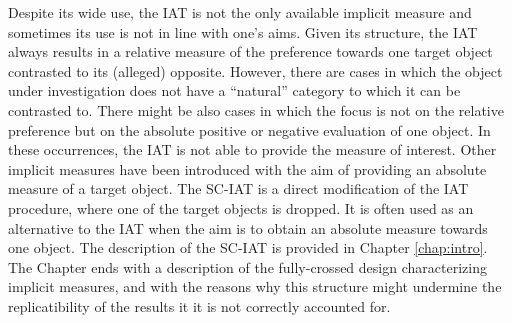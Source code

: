 \documentclass[12pt]{book}
\begin{document}
Despite its wide use, the IAT is not the only available implicit measure and sometimes its use is not in line with one's aims. 
Given its structure, the IAT always results in a relative measure of the preference towards one target object contrasted to its (alleged) opposite. 
However, there are cases in which the object under investigation does not have a ``natural'' category to which it can be contrasted to. There might be also cases in which the focus is not on the relative preference but on the absolute positive or negative evaluation of one object. In these occurrences, the IAT is not able to provide the measure of interest. 
Other implicit measures have been introduced with the aim of providing an absolute measure of a target object. The SC-IAT \cite{karpinski2006} is a direct modification of the IAT procedure, where one of the target objects is dropped. It is often used as an alternative to the IAT when the aim is to obtain an absolute measure towards one object. 
The description of the SC-IAT is provided in Chapter \ref{chap:intro}. 
The Chapter ends with a description of the fully-crossed design characterizing implicit measures, and with the reasons why this structure might undermine the replicatibility of the results it it is not correctly accounted for. 
\end{document}
